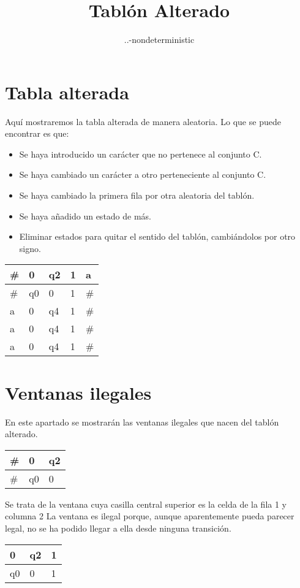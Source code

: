 ﻿\documentclass[a4paper,10pt]{article}
\title{Tablón Alterado}
\author{..\examples\has1-nondeterministic}
\date{}
\begin{document}
\maketitle

\section{Tabla alterada}

Aquí mostraremos la tabla alterada de manera aleatoria. Lo que se puede encontrar es que:
\begin{itemize}
\item Se haya introducido un carácter que no pertenece al conjunto C.
\item Se haya cambiado un carácter a otro perteneciente al conjunto C.
\item Se haya cambiado la primera fila por otra aleatoria del tablón.
\item Se haya añadido un estado de más.
\item Eliminar estados para quitar el sentido del tablón, cambiándolos por otro signo.
\end{itemize}\begin{table}[h]
\centering
\begin{tabular}{|l|l|l|l|l|}
\hline
	\#  &   0   &   q2  &   1   &   a	\\ \hline
	\#  &   q0  &   0   &   1   &   \#	\\ \hline
	a   &   0   &   q4  &   1   &   \#	\\ \hline
	a   &   0   &   q4  &   1   &   \#	\\ \hline
	a   &   0   &   q4  &   1   &   \#	\\ \hline
\end{tabular}
\end{table}
\section{Ventanas ilegales}
En este apartado se mostrarán las ventanas ilegales que nacen del tablón alterado.\newline\begin{table}[h!]
\centering
\begin{tabular}{|l|l|l|}
\hline
	\#  &   0   &   q2	\\ \hline
	\#  &   q0  &   0	\\ \hline
\end{tabular}
\end{table}

Se trata de la ventana cuya casilla central superior es la celda de la fila 1 y columna 2\newline
La ventana es ilegal porque, aunque aparentemente pueda parecer legal, no se ha podido llegar a ella desde ninguna transición.\newline
\begin{table}[h!]
\centering
\begin{tabular}{|l|l|l|}
\hline
	0   &   q2  &   1	\\ \hline
	q0  &   0   &   1	\\ \hline
\end{tabular}
\end{table}
\end{document}
